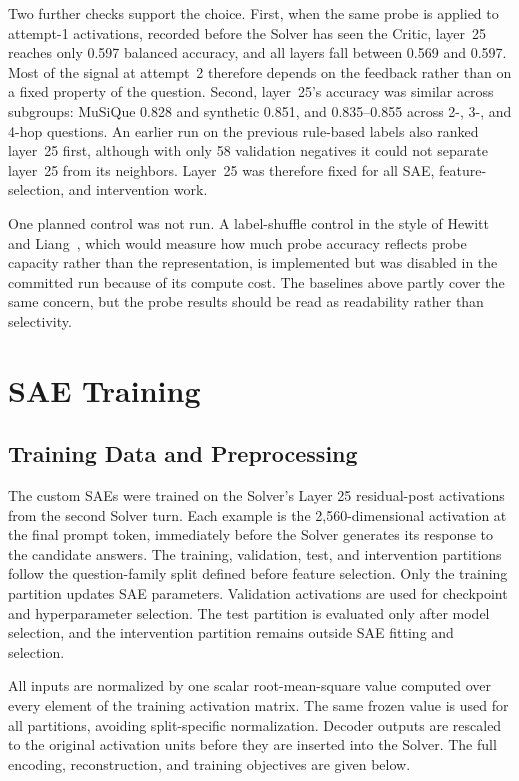 Two further checks support the choice. First, when the same probe is applied
to attempt-1 activations, recorded before the Solver has seen the Critic, layer~25
reaches only 0.597 balanced accuracy, and all layers fall between 0.569 and
0.597. Most of the signal at attempt~2 therefore depends on the feedback rather
than on a fixed property of the question. Second, layer~25's accuracy was
similar across subgroups: MuSiQue 0.828 and synthetic 0.851, and 0.835--0.855
across 2-, 3-, and 4-hop questions. An earlier run on the previous
rule-based labels also ranked layer~25 first, although with only 58 validation
negatives it could not separate layer~25 from its neighbors. Layer~25 was
therefore fixed for all SAE, feature-selection, and intervention work.

One planned control was not run. A label-shuffle control in the style of Hewitt and
Liang~\cite{hewitt2019control}, which would measure how much probe accuracy reflects
probe capacity rather than the representation, is implemented but was disabled
in the committed run because of its compute cost. The baselines above
partly cover the same concern, but the probe results should be read as
readability rather than selectivity.
\section{SAE Training}

\subsection{Training Data and Preprocessing}

The custom SAEs were trained on the Solver's Layer 25 residual-post activations
from the second Solver turn. Each example is the 2,560-dimensional activation
at the final prompt token, immediately before the Solver generates its response
to the candidate answers. The training, validation, test, and intervention
partitions follow the question-family split defined before feature selection.
Only the training partition updates SAE parameters. Validation activations are
used for checkpoint and hyperparameter selection. The test partition is
evaluated only after model selection, and the intervention partition remains
outside SAE fitting and selection.

All inputs are normalized by one scalar root-mean-square value computed over
every element of the training activation matrix. The same frozen value is used
for all partitions, avoiding split-specific normalization. Decoder outputs are
rescaled to the original activation units before they are inserted into the
Solver. The full encoding, reconstruction, and training objectives are given
below.

